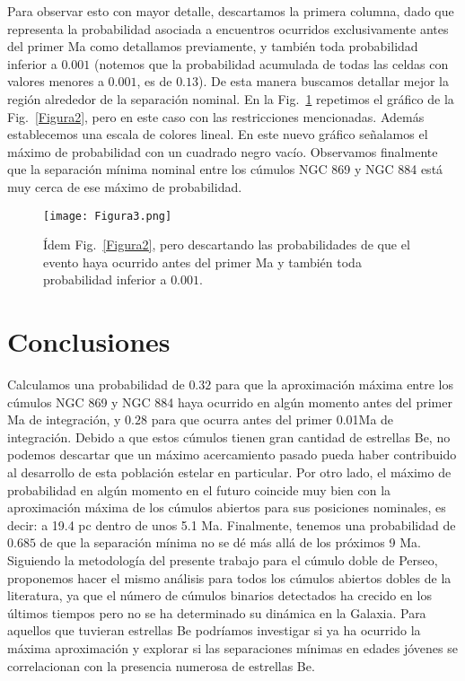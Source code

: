 \documentclass[baaa]{baaa}
\begin{document}
Para observar esto con mayor detalle, descartamos la primera columna, dado que representa la probabilidad asociada a encuentros ocurridos exclusivamente antes del primer Ma como detallamos previamente, y también toda probabilidad inferior a $0.001$ (notemos que la probabilidad acumulada de todas las celdas con valores menores a $0.001$, es de $0.13$). De esta manera buscamos detallar mejor la región alrededor de la separación nominal. En la Fig.~\ref{Figura3} repetimos el gráfico de la Fig.~\ref{Figura2}, pero en este caso con las restricciones mencionadas. Además establecemos una escala de colores lineal. En este nuevo gráfico  señalamos el máximo de probabilidad con un cuadrado negro vacío. Observamos finalmente que la separación mínima nominal entre los cúmulos NGC 869 y NGC 884 está muy cerca de ese máximo de probabilidad.
\begin{figure}[!t]
\centering
\texttt{[image: Figura3.png]}
\caption{\'Idem Fig.~\ref{Figura2}, pero descartando las probabilidades de que el evento haya ocurrido antes del primer Ma y también toda probabilidad inferior a $0.001$.}
\label{Figura3}
\end{figure}

\section{Conclusiones} 
Calculamos una probabilidad de $0.32$ para que la aproximación máxima entre los cúmulos NGC 869 y NGC 884 haya ocurrido en algún momento antes del primer Ma de integración, y $0.28$ para que ocurra antes del primer 0.01Ma de integraci\'on. Debido a que estos cúmulos tienen gran cantidad de estrellas Be, no podemos descartar que un m\'aximo acercamiento pasado pueda haber contribuido al desarrollo de esta población estelar en particular. Por otro lado, el máximo de probabilidad en algún momento en el futuro coincide muy bien con la aproximación máxima de los cúmulos abiertos para sus posiciones nominales, es decir: a 19.4 pc dentro de unos 5.1 Ma. Finalmente, tenemos una probabilidad de $0.685$ de que la separación mínima no se d\'e más allá de los próximos 9 Ma. Siguiendo la metodología del presente trabajo para el cúmulo doble de Perseo, proponemos hacer el mismo análisis para todos los cúmulos abiertos dobles de la literatura, ya que el n\'umero de c\'umulos binarios detectados ha crecido en los \'ultimos tiempos \citep{Song2022} pero no se ha determinado su din\'amica en la Galaxia. Para aquellos que tuvieran estrellas Be podr\'iamos investigar si ya ha ocurrido la m\'axima aproximaci\'on y explorar si las separaciones mínimas en edades j\'ovenes se correlacionan con la presencia numerosa de estrellas Be. 
\end{document}
